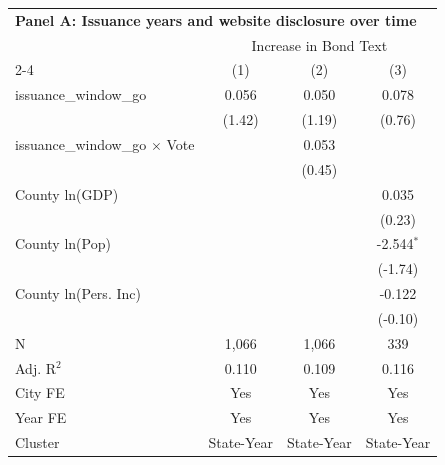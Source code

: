 \begingroup
\centering
\begin{tabular*}{\textwidth}{@{\extracolsep{\fill}}lccc}
\multicolumn{4}{l}{\textbf{Panel A: Issuance years and website disclosure over time}}\\

\addlinespace
   \toprule
    & \multicolumn{3}{c}{Increase in Bond Text}\\
   \cmidrule(lr){2-4}
                                         & (1)     & (2)     & (3)\\  
   \midrule 
   issuance\_window\_go                  & 0.056   & 0.050   & 0.078\\   
                                         & (1.42) & (1.19) & (0.76)\\   
   issuance\_window\_go $\times$ Vote    &         & 0.053   &   \\   
                                         &         & (0.45) &   \\   
   County ln(GDP)                        &         &         & 0.035\\   
                                         &         &         & (0.23)\\   
   County ln(Pop)                        &         &         & -2.544$^{*}$\\   
                                         &         &         & (-1.74)\\   
   County ln(Pers. Inc)                  &         &         & -0.122\\   
                                         &         &         & (-0.10)\\   
   \hline
   N                          & 1,066   & 1,066   & 339\\  
   Adj. R$^2$                        & 0.110   & 0.109   & 0.116\\  
   City FE                               & Yes     & Yes     & Yes\\  
   Year FE                               & Yes     & Yes     & Yes\\  
   Cluster              & State-Year & State-Year & State-Year\\  
   \bottomrule
\end{tabular*}
\par\endgroup

